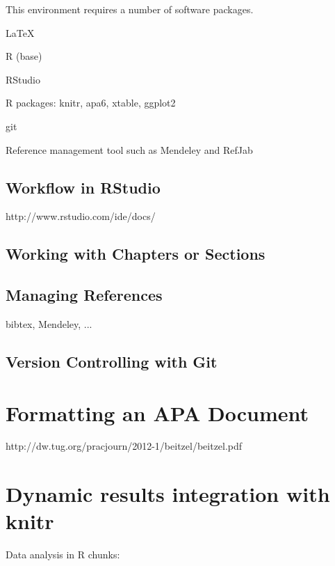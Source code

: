 \documentclass[man]{apa6}\usepackage{knitr}
\begin{document}
This environment requires a number of software packages.

\begin{APAitemize}
\item LaTeX
\item R (base)
\item RStudio
\item R packages: knitr, apa6, xtable, ggplot2
\item git
\item Reference management tool such as Mendeley and RefJab
\end{APAitemize}

\subsection{Workflow in RStudio}

http://www.rstudio.com/ide/docs/

\subsection{Working with Chapters or Sections}

\subsection{Managing References}

bibtex, Mendeley, ...

\subsection{Version Controlling with Git}


\section{Formatting an APA Document}

http://dw.tug.org/pracjourn/2012-1/beitzel/beitzel.pdf


\section{Dynamic results integration with knitr}

Data analysis in R chunks:
\end{document}
